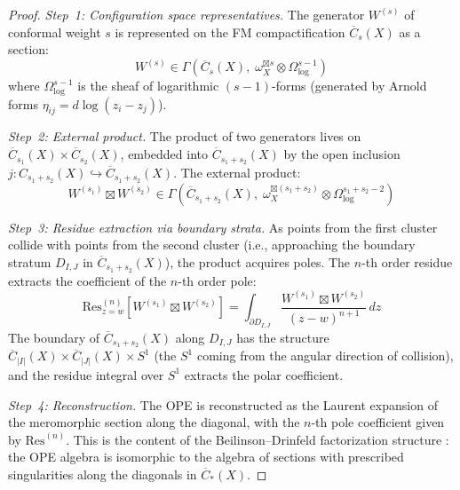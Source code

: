 \begin{proof}
\emph{Step~1: Configuration space representatives.}
The generator $W^{(s)}$ of conformal weight $s$ is represented on the FM compactification $\overline{C}_{s}(X)$ as a section:
\[
W^{(s)} \in \Gamma\!\left(\overline{C}_{s}(X),\; \omega_X^{\boxtimes s} \otimes \Omega^{s-1}_{\log}\right)
\]
where $\Omega^{s-1}_{\log}$ is the sheaf of logarithmic $(s{-}1)$-forms (generated by Arnold forms $\eta_{ij} = d\log(z_i - z_j)$).

\emph{Step~2: External product.}
The product of two generators lives on $\overline{C}_{s_1}(X) \times \overline{C}_{s_2}(X)$, embedded into $\overline{C}_{s_1+s_2}(X)$ by the open inclusion $j\colon C_{s_1+s_2}(X) \hookrightarrow \overline{C}_{s_1+s_2}(X)$.  The external product:
\[
W^{(s_1)} \boxtimes W^{(s_2)} \in \Gamma\!\left(\overline{C}_{s_1+s_2}(X),\; \omega_X^{\boxtimes(s_1+s_2)} \otimes \Omega^{s_1+s_2-2}_{\log}\right)
\]

\emph{Step~3: Residue extraction via boundary strata.}
As points from the first cluster collide with points from the second cluster (i.e., approaching the boundary stratum $D_{I,J}$ in $\overline{C}_{s_1+s_2}(X)$), the product acquires poles.  The $n$-th order residue extracts the coefficient of the $n$-th order pole:
\[
\mathrm{Res}^{(n)}_{z=w}\!\left[W^{(s_1)} \boxtimes W^{(s_2)}\right] = \int_{\partial D_{I,J}} \frac{W^{(s_1)} \boxtimes W^{(s_2)}}{(z-w)^{n+1}} \, dz
\]
The boundary of $\overline{C}_{s_1+s_2}(X)$ along $D_{I,J}$ has the structure $\overline{C}_{|I|}(X) \times \overline{C}_{|J|}(X) \times S^1$ (the $S^1$ coming from the angular direction of collision), and the residue integral over $S^1$ extracts the polar coefficient.

\emph{Step~4: Reconstruction.}
The OPE is reconstructed as the Laurent expansion of the meromorphic section along the diagonal, with the $n$-th pole coefficient given by $\mathrm{Res}^{(n)}$.  This is the content of the Beilinson--Drinfeld factorization structure \cite{BD}: the OPE algebra is isomorphic to the algebra of sections with prescribed singularities along the diagonals in $\overline{C}_*(X)$.
\end{proof}

